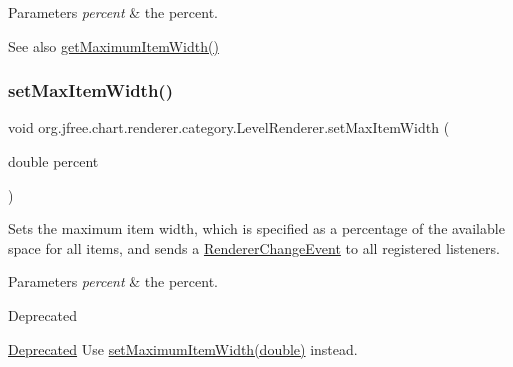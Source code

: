 \begin{DoxyParams}{Parameters}
{\em percent} & the percent.\\
\hline
\end{DoxyParams}
\begin{DoxySeeAlso}{See also}
\mbox{\hyperlink{classorg_1_1jfree_1_1chart_1_1renderer_1_1category_1_1_level_renderer_a88db8968a9830ef1873f9696b6b145e5}{get\+Maximum\+Item\+Width()}} 
\end{DoxySeeAlso}
\mbox{\label{classorg_1_1jfree_1_1chart_1_1renderer_1_1category_1_1_level_renderer_a20c2015dac7a28199026fb6a871d650b}} 
\subsubsection{\texorpdfstring{set\+Max\+Item\+Width()}{setMaxItemWidth()}}
{\footnotesize\ttfamily void org.\+jfree.\+chart.\+renderer.\+category.\+Level\+Renderer.\+set\+Max\+Item\+Width (\begin{DoxyParamCaption}\item[{double}]{percent }\end{DoxyParamCaption})}

Sets the maximum item width, which is specified as a percentage of the available space for all items, and sends a \mbox{\hyperlink{}{Renderer\+Change\+Event}} to all registered listeners.


\begin{DoxyParams}{Parameters}
{\em percent} & the percent.\\
\hline
\end{DoxyParams}
\begin{DoxyRefDesc}{Deprecated}
\item[\mbox{\hyperlink{deprecated__deprecated000182}{Deprecated}}]Use \mbox{\hyperlink{classorg_1_1jfree_1_1chart_1_1renderer_1_1category_1_1_level_renderer_ab661cdb9984c132949d5229d1f581bb4}{set\+Maximum\+Item\+Width(double)}} instead. \end{DoxyRefDesc}


